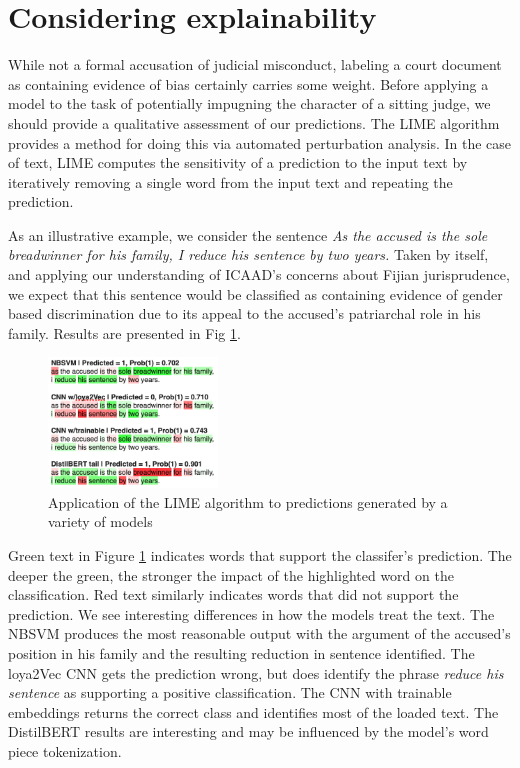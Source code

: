 \documentclass[twocolumn,10pt]{wmrDoc}
\begin{document}
\section{Considering explainability}
While not a formal accusation of judicial misconduct, labeling a court document as containing evidence of bias certainly carries some weight.  Before applying a model to the task of potentially impugning the character of a sitting judge, we should provide a qualitative assessment of our predictions.  The LIME algorithm \cite{lime} provides a method for doing this via automated perturbation analysis.  In the case of text, LIME computes the sensitivity of a prediction to the input text by iteratively removing a single word from the input text and repeating the prediction.  

As an illustrative example, we consider the sentence \emph{As the accused is the sole breadwinner for his family, I reduce his sentence by two years.}  Taken by itself, and applying our understanding of ICAAD's concerns about Fijian jurisprudence, we expect that this sentence would be classified as containing evidence of gender based discrimination due to its appeal to the accused's patriarchal role in his family. Results are presented in Fig \ref{fig:LIME}.

\begin{figure}[h]
    \centering
    \includegraphics[width=0.4\textwidth]{images/LIME2.png}
    \caption{Application of the LIME algorithm to predictions generated by a variety of models}
    \label{fig:LIME}
\end{figure}

Green text in Figure \ref{fig:LIME} indicates words that support the classifer's prediction. The deeper the green, the stronger the impact of the highlighted word on the classification.  Red text similarly indicates words that did not support the prediction.  We see interesting differences in how the models treat the text.  The NBSVM produces the most reasonable output with the argument of the accused's position in his family and the resulting reduction in sentence identified.  The loya2Vec CNN gets the prediction wrong, but does identify the phrase \emph{reduce his sentence} as supporting a positive classification.  The CNN with trainable embeddings returns the correct class and identifies most of the loaded text.  The DistilBERT results are interesting and may be influenced by the model's word piece tokenization.
\end{document}

